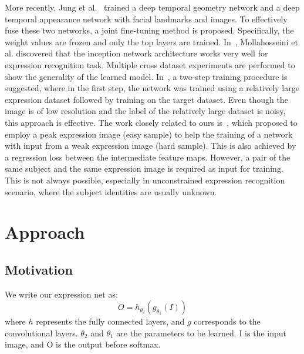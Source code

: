 \documentclass[a4paper, 10pt, conference]{ieeeconf}      %
\begin{document}
More recently, Jung et al.~\cite{jung2015deep} trained a deep temporal geometry network and a deep temporal appearance network with facial landmarks and images. To effectively fuse these two networks, a joint fine-tuning method is proposed. Specifically, the weight values are frozen and only the top layers are trained. 
In~\cite{mollahosseini2016going}, Mollahosseini et al. discovered that the inception network architecture works very well for expression recognition task. Multiple cross dataset experiments are performed to show the generality of the learned model. In~\cite{yu2015image, ng2015deep}, a two-step training procedure is suggested, where in the first step, the network was trained using a relatively large expression dataset followed by training on the target dataset. Even though the image is of low resolution and the label of the relatively large dataset is noisy, this approach is effective. The work closely related to ours is~\cite{zhao2016peak}, which proposed to employ a peak expression image (easy sample) to help the training  of a network with input from a weak expression image (hard sample). This is also achieved by a regression loss between the intermediate feature maps. However, a pair of the same subject and the same expression image is required as input for training. This is not always possible, especially in unconstrained expression recognition scenario, where the subject identities are usually unknown.  

\section{Approach}
\subsection{Motivation}
We write our expression net as:
$$O = h_{\theta_2}(g_{\theta_1}(I))$$
where $h$ represents the fully connected layers, and $g$ corresponds to the convolutional layers. $\theta_2$ and $\theta_1$ are the parameters to be learned. I is the input image, and O is the output before softmax.
\end{document}
